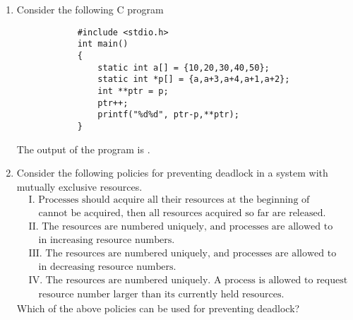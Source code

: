 \documentclass[journal,12pt,onecolumn]{IEEEtran}
\theoremstyle{remark}
\begin{document}
\begin{enumerate}
		\hfill{}
		
		\item Consider the following C program
		\begin{verbatim}
			#include <stdio.h>
			int main()
			{
				static int a[] = {10,20,30,40,50};
				static int *p[] = {a,a+3,a+4,a+1,a+2};
				int **ptr = p;
				ptr++;
				printf("%d%d", ptr-p,**ptr);
			}
		\end{verbatim}
		The output of the program is \underline{\hspace{2cm}}.
		
		\hfill{}
		
		\item Consider the following policies for preventing deadlock in a system with mutually exclusive resources.
		\begin{align*}
			&\text{I. Processes should acquire all their resources at the beginning of execution. If any resources}\\
			&\quad \text{cannot be acquired, then all resources acquired so far are released.}\\
			&\text{II. The resources are numbered uniquely, and processes are allowed to request for resources only}\\
			&\quad \text{in increasing resource numbers.}\\
			&\text{III. The resources are numbered uniquely, and processes are allowed to request for resources only}\\
			&\quad \text{in decreasing resource numbers.}\\
			&\text{IV. The resources are numbered uniquely. A process is allowed to request only for a resource with}\\
			&\quad \text{resource number larger than its currently held resources.}
		\end{align*}
		Which of the above policies can be used for preventing deadlock?
		
		\hfill{}
		
		\begin{enumerate}
		\end{enumerate}
		

\end{enumerate}
\end{document}
